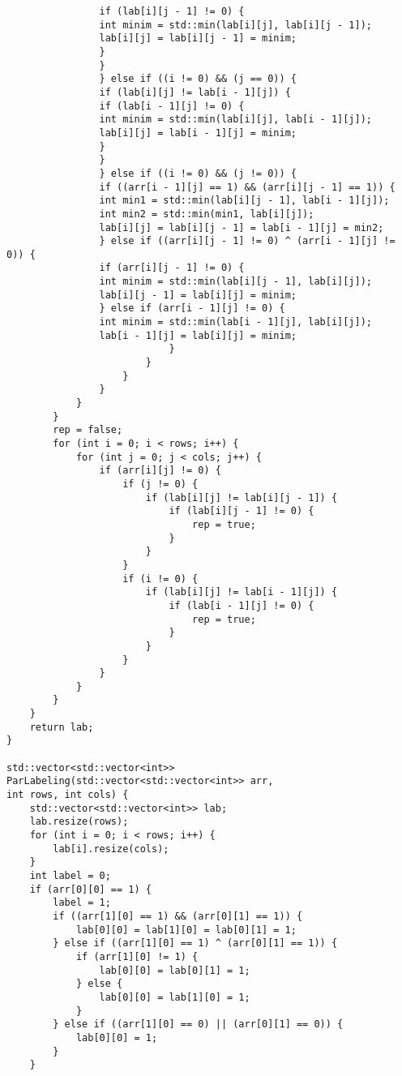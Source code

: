 \documentclass{report}
\begin{document}
\begin{lstlisting}
                if (lab[i][j - 1] != 0) {
                int minim = std::min(lab[i][j], lab[i][j - 1]);
                lab[i][j] = lab[i][j - 1] = minim;
                }
                }
                } else if ((i != 0) && (j == 0)) {
                if (lab[i][j] != lab[i - 1][j]) {
                if (lab[i - 1][j] != 0) {
                int minim = std::min(lab[i][j], lab[i - 1][j]);
                lab[i][j] = lab[i - 1][j] = minim;
                }
                }
                } else if ((i != 0) && (j != 0)) {
                if ((arr[i - 1][j] == 1) && (arr[i][j - 1] == 1)) {
                int min1 = std::min(lab[i][j - 1], lab[i - 1][j]);
                int min2 = std::min(min1, lab[i][j]);
                lab[i][j] = lab[i][j - 1] = lab[i - 1][j] = min2;
                } else if ((arr[i][j - 1] != 0) ^ (arr[i - 1][j] != 0)) {
                if (arr[i][j - 1] != 0) {
                int minim = std::min(lab[i][j - 1], lab[i][j]);
                lab[i][j - 1] = lab[i][j] = minim;
                } else if (arr[i - 1][j] != 0) {
                int minim = std::min(lab[i - 1][j], lab[i][j]);
                lab[i - 1][j] = lab[i][j] = minim;
                            }
                        }
                    }
                }
            }
        }
        rep = false;
        for (int i = 0; i < rows; i++) {
            for (int j = 0; j < cols; j++) {
                if (arr[i][j] != 0) {
                    if (j != 0) {
                        if (lab[i][j] != lab[i][j - 1]) {
                            if (lab[i][j - 1] != 0) {
                                rep = true;
                            }
                        }
                    }
                    if (i != 0) {
                        if (lab[i][j] != lab[i - 1][j]) {
                            if (lab[i - 1][j] != 0) {
                                rep = true;
                            }
                        }
                    }
                }
            }
        }
    }
    return lab;
}

std::vector<std::vector<int>> ParLabeling(std::vector<std::vector<int>> arr,
int rows, int cols) {
    std::vector<std::vector<int>> lab;
    lab.resize(rows);
    for (int i = 0; i < rows; i++) {
        lab[i].resize(cols);
    }
    int label = 0;
    if (arr[0][0] == 1) {
        label = 1;
        if ((arr[1][0] == 1) && (arr[0][1] == 1)) {
            lab[0][0] = lab[1][0] = lab[0][1] = 1;
        } else if ((arr[1][0] == 1) ^ (arr[0][1] == 1)) {
            if (arr[1][0] != 1) {
                lab[0][0] = lab[0][1] = 1;
            } else {
                lab[0][0] = lab[1][0] = 1;
            }
        } else if ((arr[1][0] == 0) || (arr[0][1] == 0)) {
            lab[0][0] = 1;
        }
    }


\end{lstlisting}
\end{document}
